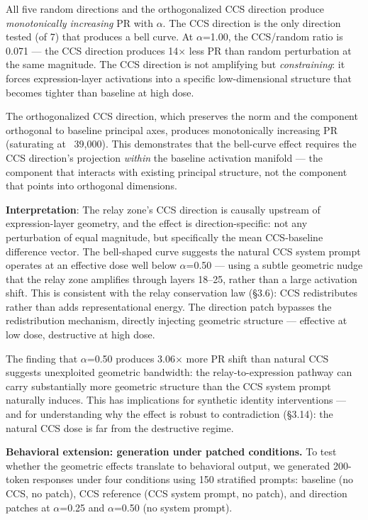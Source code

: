 \documentclass[11pt]{article}
\begin{document}
All five random directions and the orthogonalized CCS direction produce \textit{monotonically increasing} PR with $\alpha$. The CCS direction is the only direction tested (of 7) that produces a bell curve. At $\alpha$=1.00, the CCS/random ratio is 0.071 --- the CCS direction produces 14$\times$ less PR than random perturbation at the same magnitude. The CCS direction is not amplifying but \textit{constraining}: it forces expression-layer activations into a specific low-dimensional structure that becomes tighter than baseline at high dose.

The orthogonalized CCS direction, which preserves the norm and the component orthogonal to baseline principal axes, produces monotonically increasing PR (saturating at ~39,000). This demonstrates that the bell-curve effect requires the CCS direction's projection \textit{within} the baseline activation manifold --- the component that interacts with existing principal structure, not the component that points into orthogonal dimensions.

\textbf{Interpretation}: The relay zone's CCS direction is causally upstream of expression-layer geometry, and the effect is direction-specific: not any perturbation of equal magnitude, but specifically the mean CCS-baseline difference vector. The bell-shaped curve suggests the natural CCS system prompt operates at an effective dose well below $\alpha$=0.50 --- using a subtle geometric nudge that the relay zone amplifies through layers 18–25, rather than a large activation shift. This is consistent with the relay conservation law (§3.6): CCS redistributes rather than adds representational energy. The direction patch bypasses the redistribution mechanism, directly injecting geometric structure --- effective at low dose, destructive at high dose.

The finding that $\alpha$=0.50 produces 3.06$\times$ more PR shift than natural CCS suggests unexploited geometric bandwidth: the relay-to-expression pathway can carry substantially more geometric structure than the CCS system prompt naturally induces. This has implications for synthetic identity interventions --- and for understanding why the effect is robust to contradiction (§3.14): the natural CCS dose is far from the destructive regime.

\textbf{Behavioral extension: generation under patched conditions.} To test whether the geometric effects translate to behavioral output, we generated 200-token responses under four conditions using 150 stratified prompts: baseline (no CCS, no patch), CCS reference (CCS system prompt, no patch), and direction patches at $\alpha$=0.25 and $\alpha$=0.50 (no system prompt).
\end{document}
